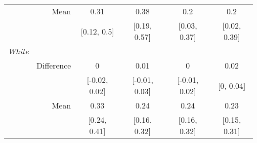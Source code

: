 \begin{table}[ht]
\begin{tabular}{lrcccc}
   & Mean & 0.31 & 0.38 & 0.2 & 0.2 \\ 
   &  & [0.12, 0.5] & [0.19, 0.57] & [0.03, 0.37] & [0.02, 0.39] \\ 
  {\textit{White}} &  &  &  &  &  \\ 
   & Difference & 0 & 0.01 & 0 & 0.02 \\ 
   &  & [-0.02, 0.02] & [-0.01, 0.03] & [-0.01, 0.02] & [0, 0.04] \\ 
   & Mean & 0.33 & 0.24 & 0.24 & 0.23 \\ 
   &  & [0.24, 0.41] & [0.16, 0.32] & [0.16, 0.32] & [0.15, 0.31] \\ 
   \hline
\end{tabular}
\end{table}
